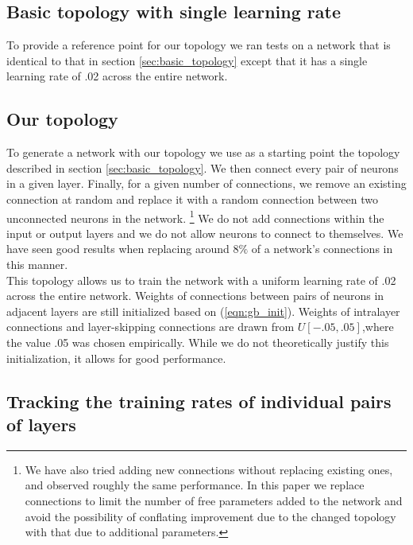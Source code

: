 \documentclass{article}
\newcommand{\npar}{\\\indent}
\begin{document}
\subsection{Basic topology with single learning rate}
\label{sec:basic_topology_uniform}

To provide a reference point for our topology we ran tests on a network that is identical to that in section \ref{sec:basic_topology} except that it has a single learning rate of .02 across the entire network.

\subsection{Our topology}
\label{sec:our_topology}

To generate a network with our topology we use as a starting point the topology described in section \ref{sec:basic_topology}. We then connect every pair of neurons in a given layer. Finally, for a given number of connections, we remove an existing connection at random and replace it with a random connection between two unconnected neurons in the network. \footnote{We have also tried adding new connections without replacing existing ones, and observed roughly the same performance. In this paper we replace connections to limit the number of free parameters added to the network and avoid the possibility of conflating improvement due to the changed topology with that due to additional parameters.} We do not add connections within the input or output layers and we do not allow neurons to connect to themselves. We have seen good results when replacing around $8\%$ of a network's connections in this manner.
\npar
This topology allows us to train the network with a uniform learning rate of .02 across the entire network. Weights of connections between pairs of neurons in adjacent layers are still initialized based on (\ref{eqn:gb_init}). Weights of intralayer connections and layer-skipping connections are drawn from $U[-.05,.05]$,where the value .05 was chosen empirically. While we do not theoretically justify this initialization, it allows for good performance.

\subsection{Tracking the training rates of individual pairs of layers}
\end{document}

